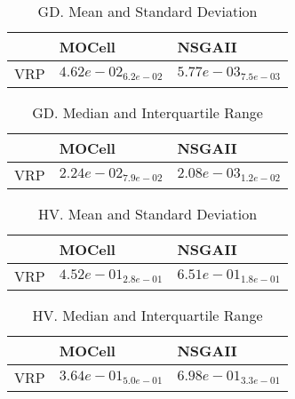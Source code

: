 \documentclass{article}
\begin{document}
\begin{table}
\caption{GD. Mean and Standard Deviation}
\label{table: GD}
\centering
\begin{scriptsize}
\begin{tabular}{lll}
\hline & MOCell &  NSGAII\\
\hline 
VRP & \cellcolor{gray25}$  4.62e-02_{ 6.2e-02}$ & \cellcolor{gray95}$  5.77e-03_{ 7.5e-03}$ \\
\hline
\end{tabular}
\end{scriptsize}
\end{table}

\begin{table}
\caption{GD. Median and Interquartile Range}
\label{table: GD}
\centering
\begin{scriptsize}
\begin{tabular}{lll}
\hline & MOCell &  NSGAII\\
\hline 
VRP & \cellcolor{gray25}$  2.24e-02_{ 7.9e-02}$ & \cellcolor{gray95}$  2.08e-03_{ 1.2e-02}$ \\
\hline
\end{tabular}
\end{scriptsize}
\end{table}

\begin{table}
\caption{HV. Mean and Standard Deviation}
\label{table: HV}
\centering
\begin{scriptsize}
\begin{tabular}{lll}
\hline & MOCell &  NSGAII\\
\hline 
VRP & \cellcolor{gray25}$  4.52e-01_{ 2.8e-01}$ & \cellcolor{gray95}$  6.51e-01_{ 1.8e-01}$ \\
\hline
\end{tabular}
\end{scriptsize}
\end{table}

\begin{table}
\caption{HV. Median and Interquartile Range}
\label{table: HV}
\centering
\begin{scriptsize}
\begin{tabular}{lll}
\hline & MOCell &  NSGAII\\
\hline 
VRP & \cellcolor{gray25}$  3.64e-01_{ 5.0e-01}$ & \cellcolor{gray95}$  6.98e-01_{ 3.3e-01}$ \\
\hline
\end{tabular}
\end{scriptsize}
\end{table}
\end{document}
